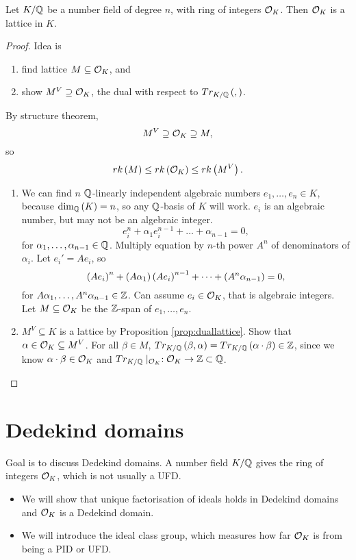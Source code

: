 \begin{theorem}
Let $ K / \mathbb{Q} $ be a number field of degree $ n $, with ring of integers $ \mathcal{O}_K $. Then $ \mathcal{O}_K $ is a lattice in $ K $.
\end{theorem}

\begin{proof}
Idea is
\begin{enumerate}
\item find lattice $ M \subseteq \mathcal{O}_K $, and
\item show $ M^V \supseteq \mathcal{O}_K $, the dual with respect to $ Tr_{K / \mathbb{Q}}\left( , \right) $.
\end{enumerate}
By structure theorem,
$$ M^V \supseteq \mathcal{O}_K \supseteq M, $$
so
$$ rk\left( M \right) \le rk\left( \mathcal{O}_K \right) \le rk\left( M^V \right). $$
\begin{enumerate}
\item We can find $ n $ $ \mathbb{Q} $-linearly independent algebraic numbers $ e_1, \dots, e_n \in K $, because $ \dim_{\mathbb{Q}}\left( K \right) = n $, so any $ \mathbb{Q} $-basis of $ K $ will work. $ e_i $ is an algebraic number, but may not be an algebraic integer.
$$ e_i^n + \alpha_1e_i^{n - 1} + \dots + \alpha_{n - 1} = 0, $$
for $ \alpha_1, \dots, \alpha_{n - 1} \in \mathbb{Q} $. Multiply equation by $ n $-th power $ A^n $ of denominators of $ \alpha_i $. Let $ e_i' = Ae_i $, so
$$ \left( Ae_i \right)^n + \left( A\alpha_1 \right)\left( Ae_i \right)^{n - 1} + \dots + \left( A^n\alpha_{n - 1} \right) = 0, $$
for $ A\alpha_1, \dots, A^n\alpha_{n - 1} \in \mathbb{Z} $. Can assume $ e_i \in \mathcal{O}_K $, that is algebraic integers. Let $ M \subseteq \mathcal{O}_K $ be the $ \mathbb{Z} $-span of $ e_1, \dots, e_n $.
\item $ M^V \subseteq K $ is a lattice by Proposition \ref{prop:duallattice}. Show that $ \alpha \in \mathcal{O}_K \subseteq M^V $. For all $ \beta \in M $, $ Tr_{K / \mathbb{Q}}\left( \beta, \alpha \right) = Tr_{K / \mathbb{Q}}\left( \alpha \cdot \beta \right) \in \mathbb{Z} $, since we know $ \alpha \cdot \beta \in \mathcal{O}_K $ and $ Tr_{K / \mathbb{Q}} \mid_{\mathcal{O}_K} : \mathcal{O}_K \to \mathbb{Z} \subset \mathbb{Q} $.
\end{enumerate}
\end{proof}

\pagebreak

\section{Dedekind domains}


Goal is to discuss Dedekind domains. A number field $ K / \mathbb{Q} $ gives the ring of integers $ \mathcal{O}_K $, which is not usually a UFD.
\begin{itemize}
\item We will show that unique factorisation of ideals holds in Dedekind domains and $ \mathcal{O}_K $ is a Dedekind domain.
\item We will introduce the ideal class group, which measures how far $ \mathcal{O}_K $ is from being a PID or UFD.
\end{itemize}

